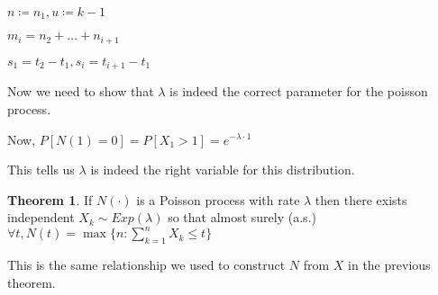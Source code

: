 \documentclass{article}
\theoremstyle{definition}
\newtheorem{theorem}{Theorem}
\begin{document}
\(n\coloneqq n_1, u\coloneqq k-1\) 

\(m_i=n_2 + \dots +n_{i+1} \) 

\(s_1=t_2 - t_1, s_i = t_{i+1} - t_1  \) 

Now we need to show that \(\lambda\) is indeed the correct parameter for the poisson process.

Now, \(P[N(1)=0]=P[X_1>1]=e^{-\lambda\cdot 1} \) 

This tells us \(\lambda\) is indeed the right variable for this distribution.

\begin{theorem}
    If \(N(\cdot)\) is a Poisson process with rate \(\lambda\) then there exists independent \(X_k \sim Exp(\lambda) \) so that almost surely (a.s.) \(\forall t, N(t)=\max\{n:\sum_{k=1}^{n} X_k \leq t\}\) 
\end{theorem}

This is the same relationship we used to construct \(N\) from $X$ in the previous theorem.
\end{document}
